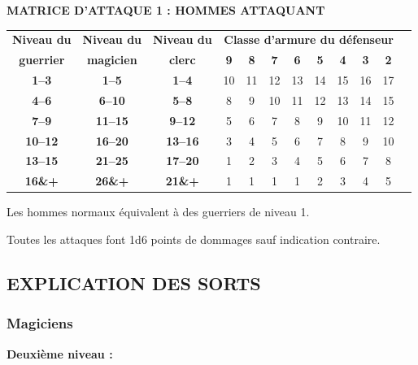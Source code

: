 \bigskip

\textbf{MATRICE D'ATTAQUE 1 : HOMMES ATTAQUANT}

\bigskip

\begin{tabular}{cccccccccccc}
\textbf{Niveau du } & \textbf{Niveau du } & \textbf{Niveau du } & \multicolumn{8}{c}{\textbf{Classe d'armure du défenseur}} \\
\textbf{guerrier}   & \textbf{magicien}   & \textbf{clerc}   & \textbf{9} & \textbf{8} & \textbf{7} & \textbf{6} & \textbf{5} & \textbf{4} & \textbf{3} & \textbf{2} \\
\textbf{1--3}   & \textbf{1--5}   & \textbf{1--4}   & 10 & 11 & 12 & 13 & 14 & 15 & 16 & 17 \\
\textbf{4--6}   & \textbf{6--10}  & \textbf{5--8}   &  8 &  9 & 10 & 11 & 12 & 13 & 14 & 15 \\
\textbf{7--9}   & \textbf{11--15} & \textbf{9--12}  &  5 &  6 &  7 &  8 &  9 & 10 & 11 & 12 \\
\textbf{10--12} & \textbf{16--20} & \textbf{13--16} &  3 &  4 &  5 &  6 &  7 &  8 &  9 & 10 \\
\textbf{13--15} & \textbf{21--25} & \textbf{17--20} &  1 &  2 &  3 &  4 &  5 &  6 &  7 &  8 \\
\textbf{16\&+}  & \textbf{26\&+}  & \textbf{21\&+}  &  1 &  1 &  1 &  1 &  2 &  3 &  4 &  5 \\
\end{tabular}

\bigskip

Les hommes normaux équivalent à des guerriers de niveau 1.

\bigskip

Toutes les attaques font 1d6 points de dommages sauf indication contraire.

\subsection*{EXPLICATION DES SORTS}

\subsubsection*{Magiciens}

\textbf{Deuxième niveau :}


